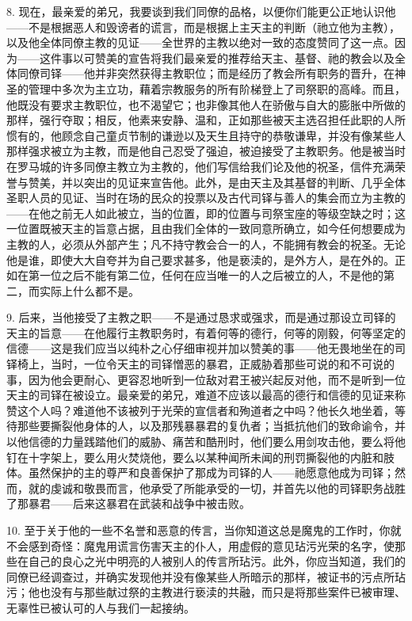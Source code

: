 8. 现在，最亲爱的弟兄，我要谈到我们同僚的品格，以便你们能更公正地认识他——不是根据恶人和毁谤者的谎言，而是根据上主天主的判断（祂立他为主教），以及他全体同僚主教的见证——全世界的主教以绝对一致的态度赞同了这一点。因为——这件事以可赞美的宣告将我们最亲爱的推荐给天主、基督、祂的教会以及全体同僚司铎——他并非突然获得主教职位；而是经历了教会所有职务的晋升，在神圣的管理中多次为主立功，藉着宗教服务的所有阶梯登上了司祭职的高峰。而且，他既没有要求主教职位，也不渴望它；也非像其他人在骄傲与自大的膨胀中所做的那样，强行夺取；相反，他素来安静、温和，正如那些被天主选召担任此职的人所惯有的，他顾念自己童贞节制的谦逊以及天生且持守的恭敬谦卑，并没有像某些人那样强求被立为主教，而是他自己忍受了强迫，被迫接受了主教职务。他是被当时在罗马城的许多同僚主教立为主教的，他们写信给我们论及他的祝圣，信件充满荣誉与赞美，并以突出的见证来宣告他。此外，是由天主及其基督的判断、几乎全体圣职人员的见证、当时在场的民众的投票以及古代司铎与善人的集会而立为主教的——在他之前无人如此被立，当的位置，即的位置与司祭宝座的等级空缺之时；这一位置既被天主的旨意占据，且由我们全体的一致同意所确立，如今任何想要成为主教的人，必须从外部产生；凡不持守教会合一的人，不能拥有教会的祝圣。无论他是谁，即使大大自夸并为自己要求甚多，他是亵渎的，是外方人，是在外的。正如在第一位之后不能有第二位，任何在应当唯一的人之后被立的人，不是他的第二，而实际上什么都不是。\par

9. 后来，当他接受了主教之职——不是通过恳求或强求，而是通过那设立司铎的天主的旨意——在他履行主教职务时，有着何等的德行，何等的刚毅，何等坚定的信德——这是我们应当以纯朴之心仔细审视并加以赞美的事——他无畏地坐在的司铎椅上，当时，一位令天主的司铎憎恶的暴君，正威胁着那些可说的和不可说的事，因为他会更耐心、更容忍地听到一位敌对君王被兴起反对他，而不是听到一位天主的司铎在被设立。最亲爱的弟兄，难道不应该以最高的德行和信德的见证来称赞这个人吗？难道他不该被列于光荣的宣信者和殉道者之中吗？他长久地坐着，等待那些要撕裂他身体的人，以及那残暴暴君的复仇者；当抵抗他们的致命谕令，并以他信德的力量践踏他们的威胁、痛苦和酷刑时，他们要么用剑攻击他，要么将他钉在十字架上，要么用火焚烧他，要么以某种闻所未闻的刑罚撕裂他的内脏和肢体。虽然保护的主的尊严和良善保护了那成为司铎的人——祂愿意他成为司铎；然而，就的虔诚和敬畏而言，他承受了所能承受的一切，并首先以他的司铎职务战胜了那暴君——后来这暴君在武装和战争中被击败。\par

10. 至于关于他的一些不名誉和恶意的传言，当你知道这总是魔鬼的工作时，你就不会感到奇怪：魔鬼用谎言伤害天主的仆人，用虚假的意见玷污光荣的名字，使那些在自己的良心之光中明亮的人被别人的传言所玷污。此外，你应当知道，我们的同僚已经调查过，并确实发现他并没有像某些人所暗示的那样，被证书的污点所玷污；他也没有与那些献过祭的主教进行亵渎的共融，而只是将那些案件已被审理、无辜性已被认可的人与我们一起接纳。\par

